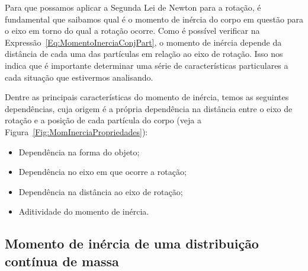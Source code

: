 Para que possamos aplicar a Segunda Lei de Newton para a rotação, é fundamental que saibamos qual é o momento de inércia do corpo em questão para o eixo em torno do qual a rotação ocorre. Como é possível verificar na Expressão~\ref{Eq:MomentoInerciaConjPart}, o momento de inércia depende da distância de cada uma das partículas em relação ao eixo de rotação. Isso nos indica que é importante determinar uma série de características particulares a cada situação que estivermos analisando.

Dentre as principais características do momento de inércia, temos as seguintes dependências, cuja origem é a própria dependência na distância entre o eixo de rotação e a posição de cada partícula do corpo (veja a Figura~\ref{Fig:MomInerciaPropriedades}):
\begin{itemize}
    \item Dependência na forma do objeto;
    \item Dependência no eixo em que ocorre a rotação;
    \item Dependência na distância ao eixo de rotação;
    
    \item Aditividade do momento de inércia.
\end{itemize}

\pagebreak
\subsection{Momento de inércia de uma distribuição contínua de massa}

